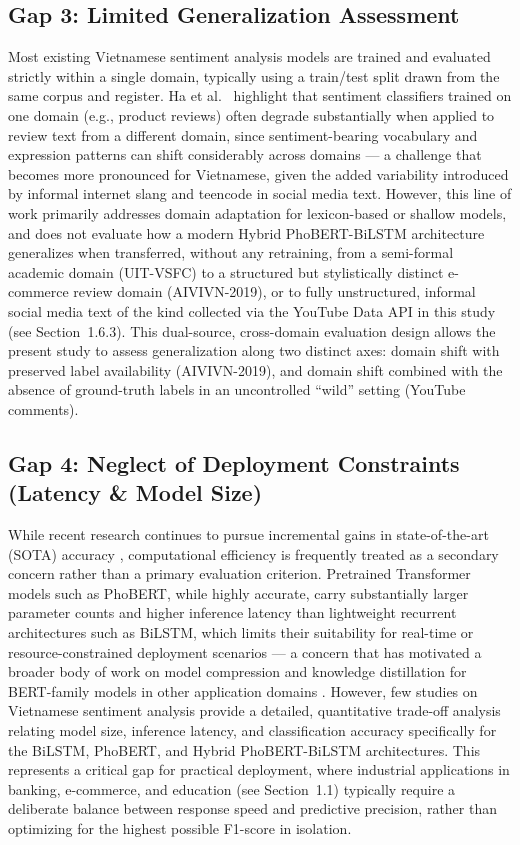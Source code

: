 \documentclass[12pt]{report} %
\begin{document}
\subsection*{Gap 3: Limited Generalization Assessment}

Most existing Vietnamese sentiment analysis models are trained and evaluated strictly within a single domain, typically using a train/test split drawn from the same corpus and register. Ha et al.\ \cite{ha2016lifelong} highlight that sentiment classifiers trained on one domain (e.g., product reviews) often degrade substantially when applied to review text from a different domain, since sentiment-bearing vocabulary and expression patterns can shift considerably across domains --- a challenge that becomes more pronounced for Vietnamese, given the added variability introduced by informal internet slang and teencode in social media text. However, this line of work primarily addresses domain adaptation for lexicon-based or shallow models, and does not evaluate how a modern Hybrid PhoBERT-BiLSTM architecture generalizes when transferred, without any retraining, from a semi-formal academic domain (UIT-VSFC) to a structured but stylistically distinct e-commerce review domain (AIVIVN-2019), or to fully unstructured, informal social media text of the kind collected via the YouTube Data API in this study (see Section~1.6.3). This dual-source, cross-domain evaluation design allows the present study to assess generalization along two distinct axes: domain shift with preserved label availability (AIVIVN-2019), and domain shift combined with the absence of ground-truth labels in an uncontrolled ``wild'' setting (YouTube comments).

\subsection*{Gap 4: Neglect of Deployment Constraints (Latency \& Model Size)}

While recent research continues to pursue incremental gains in state-of-the-art (SOTA) accuracy \cite{ieee2023challenges}, computational efficiency is frequently treated as a secondary concern rather than a primary evaluation criterion. Pretrained Transformer models such as PhoBERT, while highly accurate, carry substantially larger parameter counts and higher inference latency than lightweight recurrent architectures such as BiLSTM, which limits their suitability for real-time or resource-constrained deployment scenarios --- a concern that has motivated a broader body of work on model compression and knowledge distillation for BERT-family models in other application domains \cite{bert2dnn2020}. However, few studies on Vietnamese sentiment analysis provide a detailed, quantitative trade-off analysis relating model size, inference latency, and classification accuracy specifically for the BiLSTM, PhoBERT, and Hybrid PhoBERT-BiLSTM architectures. This represents a critical gap for practical deployment, where industrial applications in banking, e-commerce, and education (see Section~1.1) typically require a deliberate balance between response speed and predictive precision, rather than optimizing for the highest possible F1-score in isolation.
\end{document}
